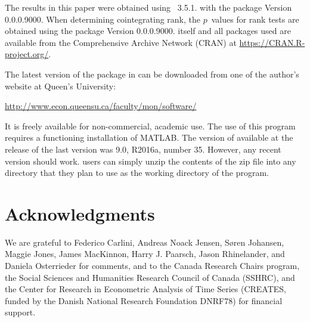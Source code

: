 \documentclass[article]{jss}
\begin{document}

The results in this paper were obtained using
~3.5.1. 
with the  package Version 0.0.0.9000. 
When determining cointegrating rank, the $p$~values for rank tests are obtained using the 
 package Version 0.0.0.9000. 
 itself
and all packages used are available from the Comprehensive
 Archive Network (CRAN) at
\url{https://CRAN.R-project.org/}.

The latest version of the  package  in \cite{Nielsen2016} 
can be downloaded from one of the author's website at Queen's University:
% 
\begin{center} \url{http://www.econ.queensu.ca/faculty/mon/software/}
\end{center}
% 
\noindent It is freely available for non-commercial, academic use. 
The use of this program requires a functioning installation of MATLAB. 
The version of  available at the release of the last version was  9.0, 	R2016a, number 35. However, any recent version should work.  
 users can simply unzip the contents of the zip file into any directory that they plan to use as the working directory of the program.



\section*{Acknowledgments}


We are grateful to Federico Carlini, Andreas Noack Jensen, S\o ren Johansen, Maggie Jones, James MacKinnon, Harry J. Paarsch, Jason Rhinelander, and Daniela Osterrieder for comments, and to the Canada Research Chairs program, the Social Sciences and Humanities Research Council of Canada (SSHRC), and the Center for Research in Econometric Analysis of Time Series (CREATES, funded by the Danish National Research Foundation DNRF78) for financial support.
\end{document}
